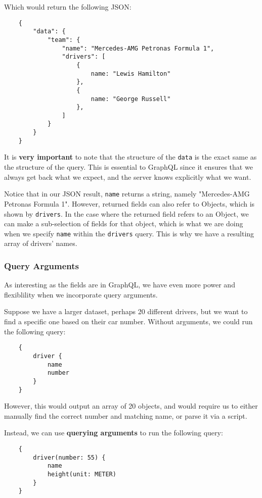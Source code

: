 \documentclass{article}
\begin{document}
Which would return the following JSON:

\begin{verbatim}
    {
        "data": {
            "team": {
                "name": "Mercedes-AMG Petronas Formula 1",
                "drivers": [
                    {
                        name: "Lewis Hamilton"
                    },
                    {
                        name: "George Russell"
                    },
                ]
            }
        }
    }
\end{verbatim}

It is \textbf{very important} to note that the structure of the \verb|data| is the exact same as the structure of the query. This is essential to GraphQL since it ensures that we always get back what we expect, and the server knows explicitly what we want.

Notice that in our JSON result, \verb|name| returns a string, namely "Mercedes-AMG Petronas Formula 1". However, returned fields can also refer to Objects, which is shown by \verb|drivers|. In the case where the returned field refers to an Object, we can make a sub-selection of fields for that object, which is what we are doing when we specify \verb|name| within the \verb|drivers| query. This is why we have a resulting array of drivers' names.

\subsubsection{Query Arguments}

As interesting as the fields are in GraphQL, we have even more power and flexiblility when we incorporate query arguments. 

Suppose we have a larger dataset, perhaps 20 different drivers, but we want to find a specific one based on their car number. Without arguments, we could run the following query:

\begin{verbatim}
    {
        driver {
            name
            number
        }
    }
\end{verbatim}

However, this would output an array of 20 objects, and would require us to either manually find the correct number and matching name, or parse it via a script.

Instead, we can use \textbf{querying arguments} to run the following query:

\begin{verbatim}
    {
        driver(number: 55) {
            name
            height(unit: METER)
        }
    }
\end{verbatim}
\end{document}
